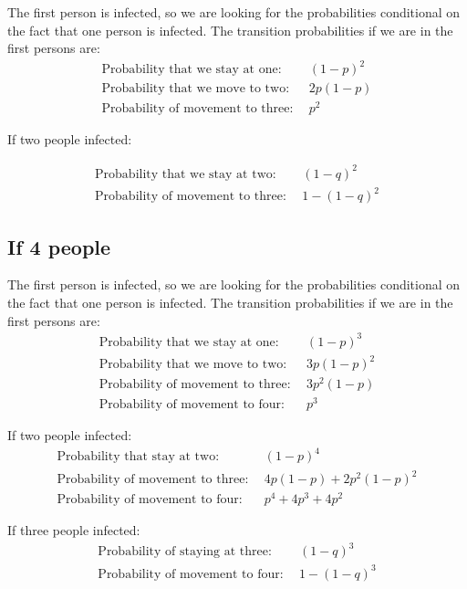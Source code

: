 \documentclass[12pt]{report}
\numberwithin{equation}{section}
\begin{document}
The first person is infected, so we are looking for the probabilities conditional on the fact that one person is infected. The transition probabilities if we are in the first persons are:
\begin{align}
\text{Probability that we stay at one:}& ~~(1-p)^2 \\
\text{Probability that we move to two:}&~~ 2p(1-p) \\
\text{Probability of movement to three:}& ~~p^2
\end{align}

If two people infected:

\begin{align} 
\text{Probability that we stay at two:}& ~~(1-q)^2 \\
\text{Probability of movement to three:}& ~~1-(1-q)^2
\end{align}

\subsection{If 4 people}

The first person is infected, so we are looking for the probabilities conditional on the fact that one person is infected. The transition probabilities if we are in the first persons are:
\begin{align}
\text{Probability that we stay at one:}& ~~(1-p)^3 \\
\text{Probability that we move to two:}& ~~3p(1-p)^2 \\
\text{Probability of movement to three:}& ~~3p^2(1-p) \\
\text{Probability of movement to four:}& ~~p^3
\end{align}

If two people infected:
\begin{align}
\text{Probability that stay at two:}&~~ (1-p)^4 \\
\text{Probability of movement to three:}& ~~4p(1-p)+2p^2(1-p)^2 \\
\text{Probability of movement to four:}& ~~p^4 + 4p^3+4p^2
\end{align}

If three people infected:
\begin{align}
\text{Probability of staying at three:}& ~~ (1-q)^3 \\
\text{Probability of movement to four:}& ~~1-(1-q)^3
\end{align}
\end{document}
